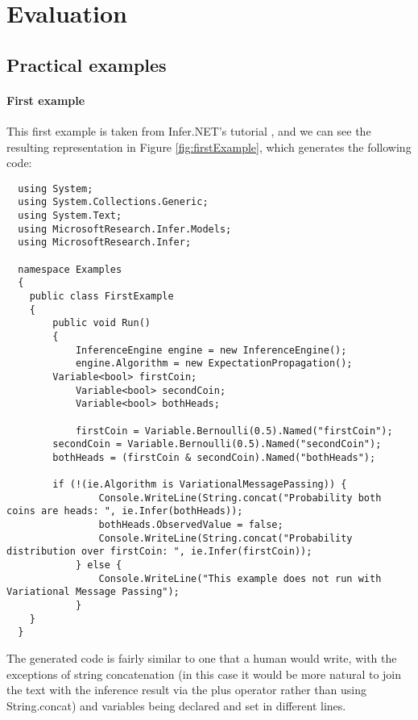 \chapter{Evaluation}\label{chap:chap4}

\section*{}

\section{Practical examples}

\subsubsection{First example}

This first example is taken from Infer.NET's tutorial \cite{InferNET14t}, and we can see
the resulting representation in Figure \ref{fig:firstExample}, which generates the following code:

\begin{lstlisting}
  using System;
  using System.Collections.Generic;
  using System.Text;
  using MicrosoftResearch.Infer.Models;
  using MicrosoftResearch.Infer;

  namespace Examples
  {
  	public class FirstExample
  	{
  		public void Run()
  		{
  			InferenceEngine engine = new InferenceEngine();
  			engine.Algorithm = new ExpectationPropagation();
        Variable<bool> firstCoin;
  			Variable<bool> secondCoin;
  			Variable<bool> bothHeads;

  			firstCoin = Variable.Bernoulli(0.5).Named("firstCoin");
        secondCoin = Variable.Bernoulli(0.5).Named("secondCoin");
        bothHeads = (firstCoin & secondCoin).Named("bothHeads");

        if (!(ie.Algorithm is VariationalMessagePassing)) {
  				Console.WriteLine(String.concat("Probability both coins are heads: ", ie.Infer(bothHeads));
  				bothHeads.ObservedValue = false;
  				Console.WriteLine(String.concat("Probability distribution over firstCoin: ", ie.Infer(firstCoin));
  			} else {
  				Console.WriteLine("This example does not run with Variational Message Passing");
    		}
  	}
  }
\end{lstlisting}

The generated code is fairly similar to one that a human would
write, with the exceptions of string concatenation (in this case it would be more natural
to join the text with the inference result via the plus operator rather than
using String.concat) and variables being declared and set in different lines.

